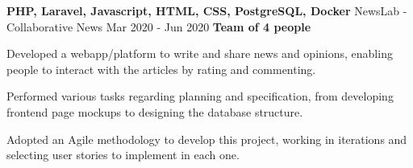   \cventry
    {\textbf{PHP, Laravel, Javascript, HTML, CSS, PostgreSQL, Docker}} %
    {NewsLab - Collaborative News \href{https://github.com/EduRibeiro00/NewsLab-feup-lbaw}{\faExternalLink}} %
    {Mar 2020 - Jun 2020} %
    {\textbf{Team of 4 people}} %
    {
      \begin{cvitems} %
        \item {Developed a webapp/platform to write and share news and opinions, enabling people to interact with the articles by rating and commenting.}
        \item {Performed various tasks regarding planning and specification, from developing frontend page mockups to designing the database structure.}
        \item {Adopted an Agile methodology to develop this project, working in iterations and selecting user stories to implement in each one.}
      \end{cvitems}
    }